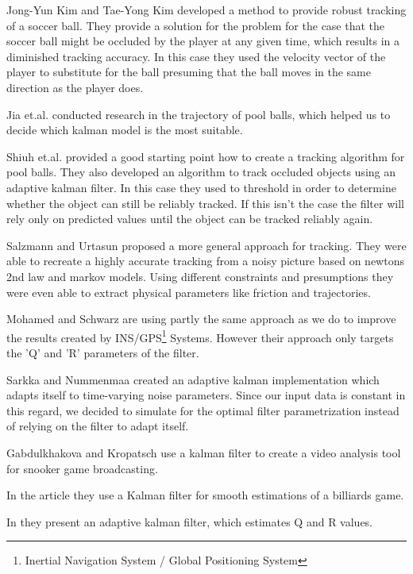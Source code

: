 \documentclass[titlepage, a4paper, 11pt]{scrartcl}
\begin{document}
        Jong-Yun Kim and Tae-Yong Kim \cite{kim} developed a method to provide robust tracking of a soccer ball. 
        They provide a solution for the problem for the case that the soccer ball might be occluded by the player at any given time,
        which results in a diminished tracking accuracy. 
        In this case they used the velocity vector of the player to substitute for the ball presuming that the ball moves in the same direction as the player does.

        Jia et.al. \cite{jia} conducted research in the trajectory of pool balls, which helped us to decide which kalman model is the most suitable.

        Shiuh et.al. \cite{shiuh} provided a good starting point how to create a tracking algorithm for pool balls. They also developed an algorithm to track occluded objects using an adaptive kalman filter.
        In this case they used to threshold in order to determine whether the object can still be reliably tracked. If this isn't the case the filter will rely only on predicted values until the object can be tracked reliably again.

        Salzmann and Urtasun \cite{salzmann} proposed a more general approach for tracking. 
        They were able to recreate a highly accurate tracking from a noisy picture based on newtons 2nd law and markov models.
        Using different constraints and presumptions they were even able to extract physical parameters like friction and trajectories.

        Mohamed and Schwarz \cite{schwarz} are using partly the same approach as we do to improve the results created by INS/GPS\footnote{Inertial Navigation System / Global Positioning System} Systems.
        However their approach only targets the 'Q' and 'R' parameters of the filter.

        Sarkka and Nummenmaa \cite{sarkka} created an adaptive kalman implementation which adapts itself to time-varying noise parameters. Since our input data is constant in this regard,
        we decided to simulate for the optimal filter parametrization instead of relying on the filter to adapt itself.

        Gabdulkhakova and Kropatsch \cite{kropatsch} use a kalman filter to create a video analysis tool for snooker game broadcasting.

        In the article \cite{wu2017capturing} they use a Kalman filter for smooth estimations of a billiards game.

        In \cite{8273755} they present an adaptive kalman filter, which estimates Q and R values. 
\end{document}

